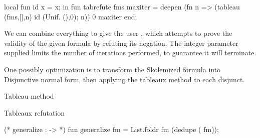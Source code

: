 local
  fun id x = x;
in
fun tabrefute fms maxiter =
  deepen (fn n =>
             (tableau (fms,[],n)
                      id
                      (Unif. (),0);
              n))
         0
         maxiter
end;
\nwendcode{}\nwdocspar

\begin{node}
We can combine everything to give the user {\Tt{}\nwendquote}, which
attempts to prove the validity of the given formula by refuting its
negation. The integer parameter supplied limits the number of
iterations performed, to guarantee it will terminate.

One possibly optimization is to transform the Skolemized formula into
Disjunctive normal form, then applying the tableaux method to each
disjunct.
\end{node}

\nwenddocs{}\endmoddef\nwstartdeflinemarkup{}\nwenddeflinemarkup
\LA{}Tableau method~{\nwtagstyle{}}\RA{}

\LA{}Tableaux refutation~{\nwtagstyle{}}\RA{}

(* generalize :  ->  *)
fun generalize fm =
  List.foldr  fm (dedupe ( fm));

